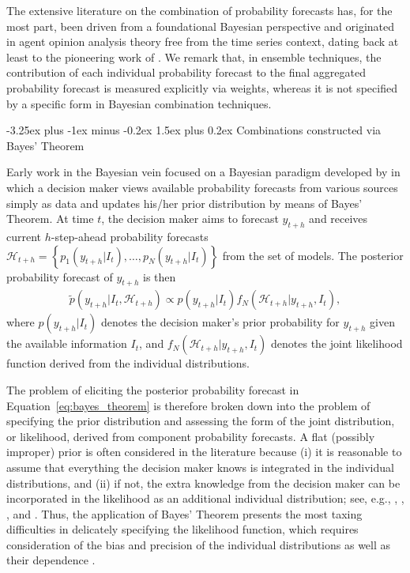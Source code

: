 \documentclass[11pt]{article}
\makeatletter
\renewcommand{\paragraph}{\@startsection{paragraph}{4}{0ex}%
   {-3.25ex plus -1ex minus -0.2ex}%
   {1.5ex plus 0.2ex}%
   {\normalfont\normalsize\bfseries}}
\makeatother
\begin{document}
The extensive literature on the combination of probability forecasts has, for the most part, been driven from a foundational Bayesian perspective and originated in agent opinion analysis theory free from the time series context, dating back at least to the pioneering work of \cite{Winkler1968-uw}. We remark that, in ensemble techniques, the contribution of each individual probability forecast to the final aggregated probability forecast is measured explicitly via weights, whereas it is not specified by a specific form in Bayesian combination techniques.

\paragraph{Combinations constructed via Bayes' Theorem}

Early work in the Bayesian vein focused on a Bayesian paradigm developed by \cite{Morris1974-yh,Morris1977-xl} in which a decision maker views available probability forecasts from various sources simply as data and updates his/her prior distribution by means of Bayes' Theorem. At time $t$, the decision maker aims to forecast $y_{t+h}$ and receives current $h$-step-ahead probability forecasts $\mathcal{H}_{t+h} = \left\{p_{1}(y_{t+h}|I_{t}), \ldots, p_{N}(y_{t+h}|I_{t})\right\}$ from the set of models. The posterior probability forecast of $y_{t+h}$ is then
\begin{align}
\label{eq:bayes_theorem}
\tilde{p}\left(y_{t+h} | I_{t}, \mathcal{H}_{t+h}\right) \propto p\left(y_{t+h} | I_{t}\right) f_{N}\left(\mathcal{H}_{t+h} | y_{t+h}, I_{t}\right),
\end{align}
where $p\left(y_{t+h} | I_{t}\right)$ denotes the decision maker's prior probability for $y_{t+h}$ given the available information $I_{t}$, and $f_{N}\left(\mathcal{H}_{t+h} | y_{t+h}, I_{t}\right)$ denotes the joint likelihood function derived from the individual distributions.

The problem of eliciting the posterior probability forecast in Equation~\eqref{eq:bayes_theorem} is therefore broken down into the problem of specifying the prior distribution and assessing the form of the joint distribution, or likelihood, derived from component probability forecasts. A flat (possibly improper) prior is often considered in the literature because (i) it is reasonable to assume that everything the decision maker knows is integrated in the individual distributions, and (ii) if not, the extra knowledge from the decision maker can be incorporated in the likelihood as an additional individual distribution; see, e.g., \cite{Winkler1968-uw}, \cite{Clemen1993-ty}, \cite{Clemen1985-kx}, and \cite{Jouini1996-fe}. Thus, the application of Bayes' Theorem presents the most taxing difficulties in delicately specifying the likelihood function, which requires consideration of the bias and precision of the individual distributions as well as their dependence \citep{Hall2004-tm}.
\end{document}

